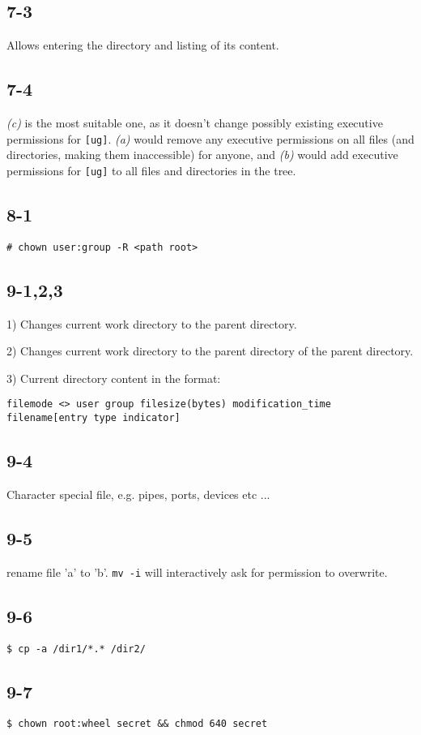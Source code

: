 \subsection{7-3}
Allows entering the directory and listing of its content.

\subsection{7-4}
\emph{(c)} is the most suitable one, as it doesn't change possibly existing executive permissions for \verb=[ug]=. \emph{(a)} would remove any executive permissions on all files (and directories, making them inaccessible) for anyone, and \emph{(b)} would add executive permissions for \verb=[ug]= to all files and directories in the tree.

\subsection{8-1}
\verb=# chown user:group -R <path root>=

\subsection{9-1,2,3}
1) Changes current work directory to the parent directory.

2) Changes current work directory to the parent directory of the parent directory.

3) Current directory content in the format:

\verb=filemode <> user group filesize(bytes) modification_time filename[entry type indicator]=

\subsection{9-4}
Character special file, e.g. pipes, ports, devices etc ...

\subsection{9-5}
rename file 'a' to 'b'. \verb=mv -i= will interactively ask for permission to overwrite.
\subsection{9-6}
\verb=$ cp -a /dir1/*.* /dir2/=

\subsection{9-7}
\verb=$ chown root:wheel secret && chmod 640 secret=

